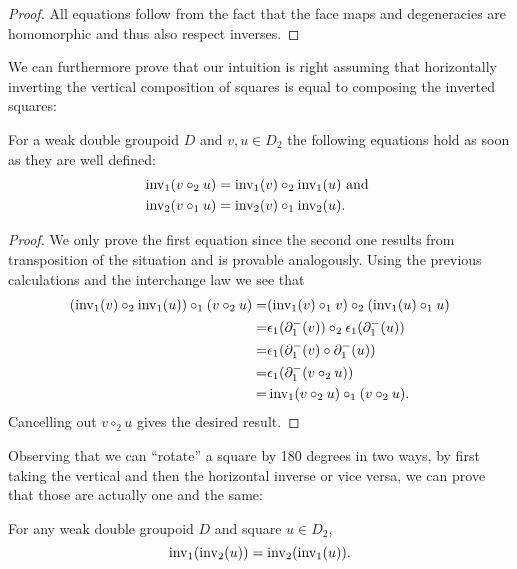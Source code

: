 \begin{proof}
All equations follow
from the fact that the face maps and degeneracies are homomorphic and thus also
respect inverses.
\end{proof}

We can furthermore prove that our intuition is right assuming that horizontally
inverting the vertical composition of squares is equal to composing the inverted
squares:

\begin{lemma} For a weak double groupoid $D$ and
$v, u \in D_2$ the following equations hold as soon as they are well defined:
\begin{equation} \label{eq:inv-distrib}
\begin{aligned}
\operatorname{inv_1}(v \circ_2 u) &= \operatorname{inv_1}(v) \circ_2 \operatorname{inv_1}(u) \text{ and } \\
\operatorname{inv_2}(v \circ_1 u) &= \operatorname{inv_2}(v) \circ_1 \operatorname{inv_2}(u) \text{.}
\end{aligned}
\end{equation}
\end{lemma}

\begin{proof}
We only prove the first equation since the second one results from transposition
of the situation and is provable analogously.
Using the previous calculations and the interchange law we see that
\begin{align*}
(\operatorname{inv_1}(v) \circ_2 \operatorname{inv_1}(u)) \circ_1 (v \circ_2 u)
= 	& (\operatorname{inv_1}(v) \circ_1 v) \circ_2 (\operatorname{inv_1}(u) \circ_1 u) \\
= 	& \epsilon_1(\partial^-_1(v)) \circ_2 \epsilon_1(\partial^-_1(u)) \\
=	& \epsilon_1(\partial^-_1(v) \circ \partial^-_1(u)) \\
=	& \epsilon_1(\partial^-_1(v \circ_2 u)) \\
=	& \operatorname{inv_1}(v \circ_2 u) \circ_1 (v \circ_2 u) \text{.}
\end{align*}
Cancelling out $v \circ_2 u$ gives the desired result.
\end{proof}

Observing that we can ``rotate'' a square by 180 degrees in two ways, by first
taking the vertical and then the horizontal inverse or vice versa, we can prove
that those are actually one and the same:

\begin{lemma} \label{thm:rotate-180}
For any weak double groupoid $D$ and square $u \in D_2$,
\begin{equation*}
\operatorname{inv_1}(\operatorname{inv_2}(u)) = \operatorname{inv_2}(\operatorname{inv_1}(u)) \text{.}
\end{equation*}
\end{lemma}

